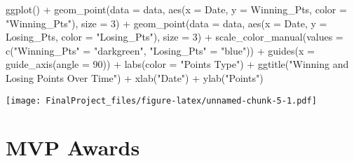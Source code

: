 \documentclass[
]{article}
\newenvironment{Shaded}{\begin{snugshade}}{\end{snugshade}}
\newcommand{\AttributeTok}[1]{\textcolor[rgb]{0.77,0.63,0.00}{#1}}
\newcommand{\DecValTok}[1]{\textcolor[rgb]{0.00,0.00,0.81}{#1}}
\newcommand{\FunctionTok}[1]{\textcolor[rgb]{0.00,0.00,0.00}{#1}}
\newcommand{\NormalTok}[1]{#1}
\newcommand{\OtherTok}[1]{\textcolor[rgb]{0.56,0.35,0.01}{#1}}
\newcommand{\SpecialCharTok}[1]{\textcolor[rgb]{0.00,0.00,0.00}{#1}}
\newcommand{\StringTok}[1]{\textcolor[rgb]{0.31,0.60,0.02}{#1}}
\begin{document}
\begin{Shaded}
\begin{Highlighting}[]
\FunctionTok{ggplot}\NormalTok{() }\SpecialCharTok{+}
  \FunctionTok{geom\_point}\NormalTok{(}\AttributeTok{data =}\NormalTok{ data, }\FunctionTok{aes}\NormalTok{(}\AttributeTok{x =}\NormalTok{ Date, }\AttributeTok{y =}\NormalTok{ Winning\_Pts, }\AttributeTok{color =} \StringTok{"Winning\_Pts"}\NormalTok{), }\AttributeTok{size =} \DecValTok{3}\NormalTok{) }\SpecialCharTok{+}
  \FunctionTok{geom\_point}\NormalTok{(}\AttributeTok{data =}\NormalTok{ data, }\FunctionTok{aes}\NormalTok{(}\AttributeTok{x =}\NormalTok{ Date, }\AttributeTok{y =}\NormalTok{ Losing\_Pts, }\AttributeTok{color =} \StringTok{"Losing\_Pts"}\NormalTok{), }\AttributeTok{size =} \DecValTok{3}\NormalTok{) }\SpecialCharTok{+}
  \FunctionTok{scale\_color\_manual}\NormalTok{(}\AttributeTok{values =} \FunctionTok{c}\NormalTok{(}\StringTok{"Winning\_Pts"} \OtherTok{=} \StringTok{"darkgreen"}\NormalTok{, }\StringTok{"Losing\_Pts"} \OtherTok{=} \StringTok{"blue"}\NormalTok{)) }\SpecialCharTok{+}
  \FunctionTok{guides}\NormalTok{(}\AttributeTok{x =} \FunctionTok{guide\_axis}\NormalTok{(}\AttributeTok{angle =} \DecValTok{90}\NormalTok{)) }\SpecialCharTok{+}
  \FunctionTok{labs}\NormalTok{(}\AttributeTok{color =} \StringTok{"Points Type"}\NormalTok{) }\SpecialCharTok{+}
  \FunctionTok{ggtitle}\NormalTok{(}\StringTok{"Winning and Losing Points Over Time"}\NormalTok{) }\SpecialCharTok{+}
  \FunctionTok{xlab}\NormalTok{(}\StringTok{"Date"}\NormalTok{) }\SpecialCharTok{+}
  \FunctionTok{ylab}\NormalTok{(}\StringTok{"Points"}\NormalTok{)}
\end{Highlighting}
\end{Shaded}

\texttt{[image: FinalProject\_files/figure-latex/unnamed-chunk-5-1.pdf]}

\hypertarget{mvp-awards}{%
\section{MVP Awards}\label{mvp-awards}}

\begin{Shaded}
\end{Shaded}
\end{document}
